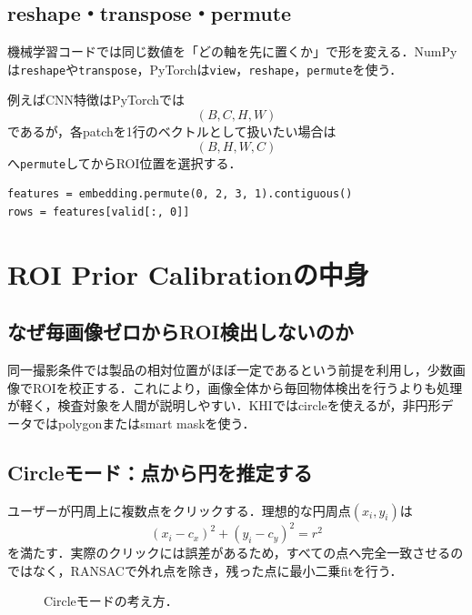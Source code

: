 \documentclass[a4paper,11pt]{ltjsreport}
\begin{document}
\section{reshape・transpose・permute}
機械学習コードでは同じ数値を「どの軸を先に置くか」で形を変える．NumPyは\texttt{reshape}や\texttt{transpose}，PyTorchは\texttt{view}，\texttt{reshape}，\texttt{permute}を使う．

例えばCNN特徴はPyTorchでは
\[
(B,C,H,W)
\]
であるが，各patchを1行のベクトルとして扱いたい場合は
\[
(B,H,W,C)
\]
へ\texttt{permute}してからROI位置を選択する．

\begin{lstlisting}
features = embedding.permute(0, 2, 3, 1).contiguous()
rows = features[valid[:, 0]]
\end{lstlisting}

\chapter{ROI Prior Calibrationの中身}

\section{なぜ毎画像ゼロからROI検出しないのか}
同一撮影条件では製品の相対位置がほぼ一定であるという前提を利用し，少数画像でROIを校正する．これにより，画像全体から毎回物体検出を行うよりも処理が軽く，検査対象を人間が説明しやすい．KHIではcircleを使えるが，非円形データではpolygonまたはsmart maskを使う．

\section{Circleモード：点から円を推定する}
ユーザーが円周上に複数点をクリックする．理想的な円周点\((x_i,y_i)\)は
\[
(x_i-c_x)^2+(y_i-c_y)^2=r^2
\]
を満たす．実際のクリックには誤差があるため，すべての点へ完全一致させるのではなく，RANSACで外れ点を除き，残った点に最小二乗fitを行う．

\begin{figure}[H]
\centering
{}
\caption{Circleモードの考え方．}
\end{figure}
\end{document}
